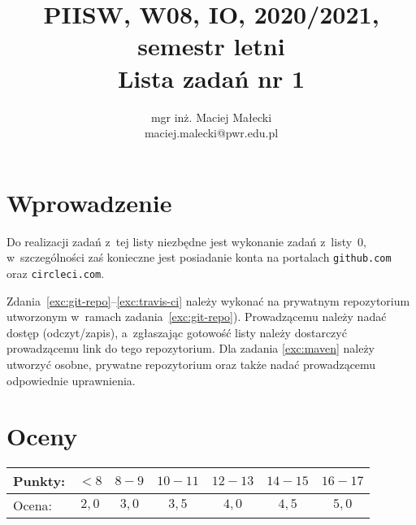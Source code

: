 \documentclass[12pt]{article}
\title{PIISW, W08, IO, 2020/2021, semestr letni\\Lista zadań nr 1}
\author{mgr inż. Maciej Małecki\\ \small maciej.malecki@pwr.edu.pl}
\begin{document}
    \maketitle

    \section*{Wprowadzenie}
        Do realizacji zadań z~tej listy niezbędne jest wykonanie zadań z~listy~0, w~szczególności zaś konieczne jest posiadanie konta na portalach \texttt{github.com} oraz \texttt{circleci.com}.

        Zdania~\ref{exc:git-repo}--\ref{exc:travis-ci} należy wykonać na prywatnym repozytorium utworzonym w~ramach zadania~\ref{exc:git-repo}). Prowadzącemu należy nadać dostęp (odczyt/zapis), a~zgłaszając gotowość listy należy dostarczyć prowadzącemu link do tego repozytorium. Dla zadania \ref{exc:maven} należy utworzyć osobne, prywatne repozytorium oraz także nadać prowadzącemu odpowiednie uprawnienia.

    \section*{Oceny}
    \begin{tabular}{|l|c|c|c|c|c|c|}
        \hline
        Punkty: & $<8$ & $8-9$ & $10-11$ & $12-13$ & $14-15$ & $16-17$\\
        \hline
        Ocena:  & $2,0$ & $3,0$ & $3,5$ & $4,0$ & $4,5$ & $5,0$\\
        \hline
    \end{tabular}
\end{document}
